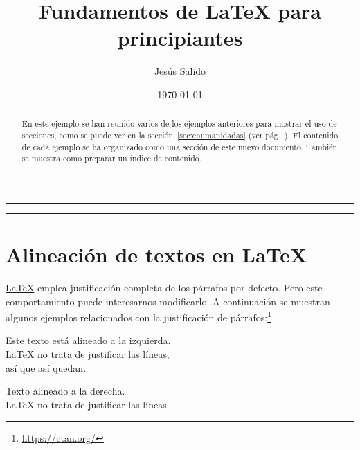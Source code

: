 \documentclass[11pt,a4paper]{article}
\author{Jesús Salido}
\title{Fundamentos de \LaTeX{} para principiantes}
\date{\today}
\begin{document}
\maketitle 

\begin{abstract}
	En este ejemplo se han reunido varios de los ejemplos anteriores para mostrar el uso de secciones, como se puede ver en la sección~\ref{sec:enumanidadas} (ver pág.~\pageref{sec:enumanidadas}). El contenido de cada ejemplo se ha organizado como una sección de este nuevo documento. También se muestra como preparar un índice de contenido.
\end{abstract}


\hrule %
\tableofcontents %
\vspace{0.5cm} %
\hrule

\section{Alineación de textos en \LaTeX{}}
\label{sec:alinea} %

\href{https://ctan.org/}{\LaTeX} emplea justificación completa de los párrafos por defecto. Pero este comportamiento puede interesarnos modificarlo. A continuación se muestran algunos ejemplos relacionados con la justificación de párrafos:\footnote{\url{https://ctan.org/}}

\begin{flushleft}
	Este texto está alineado a la izquierda. \\
	\LaTeX{} no trata de justificar las líneas, \\ 
	así que así quedan.
\end{flushleft}

\begin{flushright}
	Texto alineado a la derecha. \\
	\LaTeX{} no trata de justificar las líneas.
\end{flushright}
\end{document}

